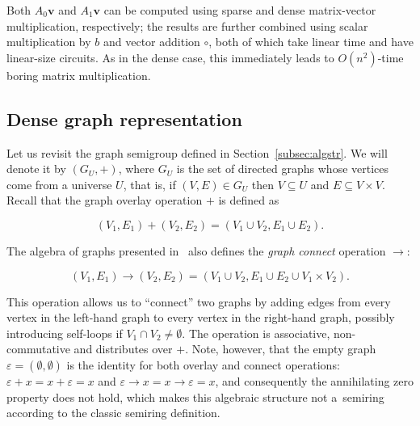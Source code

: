 \documentclass[11pt,letterpaper]{article}
\begin{document}

\noindent
Both $A_0 \mathbf{v}$ and $A_1 \mathbf{v}$ can be computed using sparse and
dense matrix-vector multiplication, respectively; the results are further
combined using scalar multiplication by $b$ and vector addition $\circ$, both of
which take linear time and have linear-size circuits. As in the dense case, this
immediately leads to $O(n^2)$-time boring matrix multiplication.

\subsection{Dense graph representation}\label{sec-dense-graph}

Let us revisit the graph semigroup defined in Section~\ref{subsec:algstr}.
We will denote it by $(G_U, +)$, where $G_U$ is the set of directed graphs whose
vertices come from a universe $U$, that is, if $(V, E) \in G_U$ then
$V \subseteq U$ and $E \subseteq V \times V$. Recall that the graph overlay
operation $+$ is defined as

\[
(V_1, E_1) + (V_2, E_2) = (V_1 \cup V_2, E_1 \cup E_2).
\]

\noindent
The algebra of graphs presented in~\cite{mokhov2017algebraic} also defines
the \emph{graph connect} operation $\rightarrow$:

\[
(V_1, E_1) \rightarrow (V_2, E_2) = (V_1 \cup V_2, E_1 \cup E_2 \cup V_1 \times V_2).
\]

This operation allows us to ``connect'' two graphs by adding edges from every
vertex in the left-hand graph to every vertex in the right-hand graph, possibly
introducing self-loops if $V_1 \cap V_2 \neq \emptyset$. The operation is
associative, non-commutative and distributes over $+$. Note, however, that the
empty graph $\varepsilon = (\emptyset, \emptyset)$ is the identity for both
overlay and connect operations: $\varepsilon + x = x + \varepsilon = x$ and
$\varepsilon \rightarrow x = x \rightarrow \varepsilon = x$, and consequently
the annihilating zero property does not hold, which makes this algebraic
structure not a~semiring according to the classic semiring definition.
\end{document}

